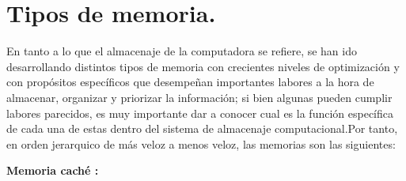 \documentclass[12pt]{article}
\begin{document}
\section{Tipos de memoria.} \label{contenido}
En tanto a lo que el almacenaje de la computadora se refiere, se han ido desarrollando distintos tipos de memoria con crecientes niveles de optimización y con propósitos específicos que desempeñan importantes labores a la hora de almacenar, organizar y priorizar la información; si bien algunas pueden cumplir labores parecidos, es muy importante dar a conocer cual es la función específica de cada una de estas dentro del sistema de almacenaje computacional.Por tanto, en orden jerarquico de más veloz a menos veloz, las memorias son las siguientes:
\begin{itemize}
\vspace{15PT}
\textbf{Memoria caché :}


\end{itemize}
\end{document}
